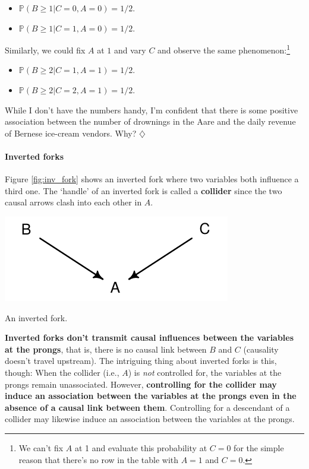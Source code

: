 \documentclass[a4paper]{tufte-book}\usepackage[]{graphicx}\usepackage[]{xcolor}
\newcommand{\term}[1]{\textbf{#1}}
\newcommand*{\parend}[1][$\diamondsuit$]{%
\leavevmode\unskip\penalty9999 \hbox{}\nobreak\hfill
    \quad\hbox{#1}%
}
\begin{document}
\begin{itemize}
 \item $\mathbb{P}(B \geq 1 | C = 0, A = 0) = 1/2.$
 \item $\mathbb{P}(B \geq 1 | C = 1, A = 0) = 1/2.$
\end{itemize}

Similarly, we could fix $A$ at $1$ and vary $C$ and observe the same phenomenon:\footnote{We can't fix $A$ at 1 and evaluate
this probability at $C = 0$ for the simple reason that there's no row in the table with $A = 1$ and $C = 0$.}

\begin{itemize}
 \item $\mathbb{P}(B \geq 2 | C = 1, A = 1) = 1/2.$
 \item $\mathbb{P}(B \geq 2 | C = 2, A = 1) = 1/2.$
\end{itemize}

While I don't have the numbers handy,
I'm confident that there is some positive association between the number
of drownings in the Aare and the daily revenue of Bernese ice-cream vendors.
Why?
\parend


\paragraph{Inverted forks}
Figure \ref{fig:inv_fork} shows an inverted fork where two variables both influence
a third one. The `handle' of an inverted fork is called a \term{collider}
since the two causal arrows clash into each other in $A$.

\begin{marginfigure}
\includegraphics[width=\textwidth]{figure/inv_fork}
\caption{An inverted fork.}
\label{fig:inv_fork}
\end{marginfigure}

\textbf{Inverted forks don't transmit causal influences between the variables at the prongs},
that is, there is no causal link between $B$ and $C$ (causality doesn't travel upstream).
The intriguing thing about inverted forks is this, though:
When the collider (i.e., $A$) is \emph{not} controlled for, the variables
at the prongs remain unassociated.
However, \textbf{controlling for the collider may induce an association between
the variables at the prongs even in the absence of a causal link between them}.
Controlling for a descendant of a collider
may likewise induce an association between the variables at the prongs.
\end{document}

